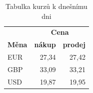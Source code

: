 \documentclass[a4paper, 11pt]{article}
\begin{document}
		\begin{table}[ht]
		\begin{center}	
			\begin{tabular}{|l|r|r|}
			\hline
					 &\multicolumn{2}{c|}{ \textbf{Cena}} \\
			\cline{2-3}
			\textbf{Měna} & \textbf{nákup} & \textbf{prodej}\\
			\hline
				EUR	 & 27,34 & 27,42\\
				GBP	 & 33,09 & 33,21\\
				USD	 & 19,87 & 19,95\\
			\hline
			\end{tabular}
		\caption{Tabulka kurzů k dnešnímu dni}
		\label{tab:ExRate}
		\end{center}
		\end{table}
\end{document}
